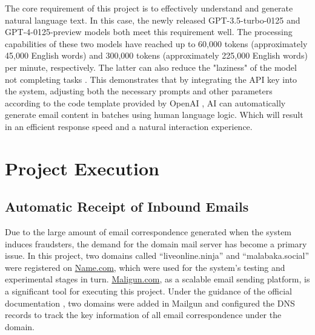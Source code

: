 \documentclass[ oneside,%
                    author={Cassie Qing Tang},
                    degree={BSc},
                     title={An Automated Response System for Disrupting Online Pet Scamming \\ },
                    subtitle={ }]{dissertation}
\begin{document}
The core requirement of this project is to effectively understand and generate natural language text. In this case, the newly released GPT-3.5-turbo-0125 and GPT-4-0125-preview models both meet this requirement well. The processing capabilities of these two models have reached up to 60,000 tokens (approximately 45,000 English words) and 300,000 tokens (approximately 225,000 English words) per minute, respectively. The latter can also reduce the "laziness" of the model not completing tasks \cite{noauthor_openai_nodate}. This demonstrates that by integrating the API key into the system, adjusting both the necessary prompts and other parameters according to the code template provided by OpenAI \cite{noauthor_openai_nodate}, AI can automatically generate email content in batches using human language logic. Which will result in an efficient response speed and a natural interaction experience.




\chapter{Project Execution}
\section{Automatic Receipt of Inbound Emails}
Due to the large amount of email correspondence generated when the system induces fraudsters, the demand for the domain mail server has become a primary issue. In this project, two domains called “liveonline.ninja” and “malabaka.social” were registered on \href{https://www.name.com}{Name.com}, which were used for the system's testing and experimental stages in turn. \href{https://www.mailgun.com}{Maligun.com}, as a scalable email sending platform, is a significant tool for executing this project. Under the guidance of the official documentation \cite{noauthor_domain_nodate}, two domains were added in Mailgun and configured the DNS records to track the key information of all email correspondence under the domain.
\\
\end{document}
